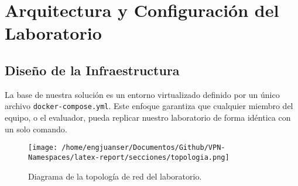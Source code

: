 \section{Arquitectura y Configuración del Laboratorio}

\subsection{Diseño de la Infraestructura}

La base de nuestra solución es un entorno virtualizado definido por un único archivo \texttt{docker-compose.yml}. Este enfoque garantiza que cualquier miembro del equipo, o el evaluador, pueda replicar nuestro laboratorio de forma idéntica con un solo comando.

\begin{figure}[H]
    \centering
    \begin{tcolorbox}[width=\textwidth, colback=white, colframe=black, boxrule=1pt, title=Topología de Red Implementada]
        \centering
        \texttt{[image: /home/engjuanser/Documentos/Github/VPN-Namespaces/latex-report/secciones/topologia.png]}
    \end{tcolorbox}
    \caption{Diagrama de la topología de red del laboratorio.}
    \label{fig:topologia}
\end{figure}

